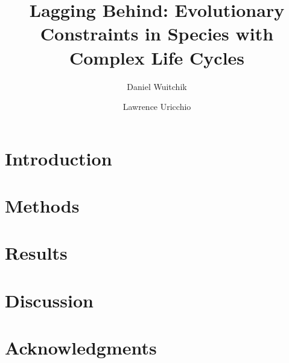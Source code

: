 \documentclass[12pt]{article}
\title{Lagging Behind: Evolutionary Constraints in Species with Complex Life Cycles}
\author[1]{Daniel Wuitchik}
\author[1]{Lawrence Uricchio}
\affil[1]{Department of Biology, Tufts University}
\begin{document}
\maketitle

\begin{abstract}

\end{abstract}

\section*{Introduction}


\section*{Methods}


\section*{Results}


\section*{Discussion}


\section*{Acknowledgments}




\end{document}
